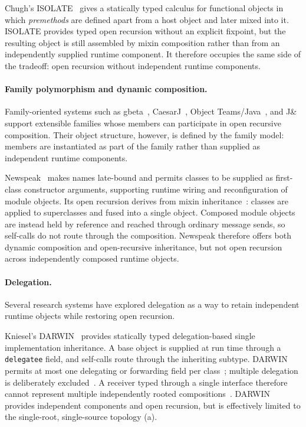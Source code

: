 \documentclass[acmsmall,screen,review,anonymous]{acmart}
\theoremstyle{acmplain}
\newcommand{\code}[1]{\texttt{#1}}
\begin{document}
Chugh's ISOLATE~\cite{chugh2015} gives a statically typed calculus for
functional objects in which \emph{premethods} are defined apart from a host
object and later mixed into it. ISOLATE provides typed open recursion without
an explicit fixpoint, but the resulting object is still assembled by mixin
composition rather than from an independently supplied runtime component.
It therefore occupies the same side of the tradeoff: open recursion without
independent runtime components.

\paragraph{Family polymorphism and dynamic composition.}
Family-oriented systems such as gbeta~\cite{ernst2001,ernst2006}, CaesarJ~\cite{aracic2006},
Object Teams/Java~\cite{herrmann2002}, and J\&~\cite{nystrom2006}
support extensible families whose members can participate in open recursive
composition. Their object structure, however, is defined by the family model:
members are instantiated as part of the family rather than supplied as
independent runtime components.

Newspeak~\cite{bracha2010} makes names late-bound and permits classes to be
supplied as first-class constructor arguments, supporting runtime wiring and
reconfiguration of module objects. Its open recursion derives from mixin
inheritance~\cite{bracha1990}: classes are applied to superclasses and fused
into a single object. Composed module objects are instead held by reference
and reached through ordinary message sends, so self-calls do not route through
the composition. Newspeak therefore offers both dynamic composition and
open-recursive inheritance, but not open recursion across independently
composed runtime objects.

\paragraph{Delegation.}
Several research systems have explored delegation as a way to retain independent
runtime objects while restoring open recursion.

Kniesel's DARWIN~\cite{kniesel1999,kniesel2000} provides statically typed
delegation-based single implementation inheritance. A base object is supplied
at run time through a \code{delegatee} field, and self-calls route through the
inheriting subtype. DARWIN permits at most one delegating or forwarding field
per class~\cite[\S6.5]{kniesel2000}; multiple delegation is deliberately
excluded~\cite[\S6.5.1]{kniesel2000}. A receiver typed through a single
interface therefore cannot represent multiple independently rooted
compositions~\cite[\S5.5.4]{kniesel2000}. DARWIN provides independent
components and open recursion, but is effectively limited to the
single-root, single-source topology (a).
\end{document}
